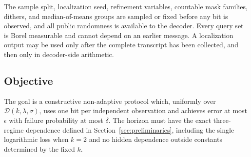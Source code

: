 \begin{assumption}\label{assump:precommitted-protocol}
The sample split, localization seed, refinement variables, countable mask
families, dithers, and median-of-means groups are sampled or fixed before any
bit is observed, and all public randomness is available to the decoder.  Every
query set is Borel measurable and cannot depend on an earlier message.  A
localization output may be used only after the complete transcript has been
collected, and then only in decoder-side arithmetic.
\end{assumption}

\subsection{Objective}

The goal is a constructive non-adaptive protocol which, uniformly over
$\mathcal D(k,\lambda,\sigma)$, uses one bit per independent observation and
achieves error at most $\epsilon$ with failure probability at most $\delta$.
The horizon must have the exact three-regime dependence defined in
Section~\ref{sec:preliminaries}, including the single logarithmic loss when
$k=2$ and no hidden dependence outside constants determined by the fixed $k$.
